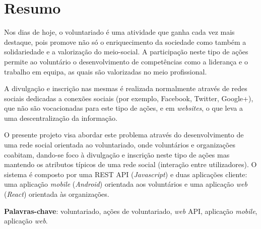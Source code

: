 \section*{Resumo}
Nos dias de hoje, o voluntariado é uma atividade que ganha cada vez mais destaque, pois promove não só o enriquecimento da sociedade como também a solidariedade e a valorização do meio-social. A participação neste tipo de ações permite ao voluntário o desenvolvimento de competências como a liderança e o trabalho em equipa, as quais são valorizadas no meio profissional. \par \smallskip
A divulgação e inscrição nas mesmas é realizada normalmente através de redes sociais dedicadas a conexões sociais (por exemplo, Facebook, Twitter, Google+), que  não são vocacionadas para este tipo de ações, e em \textit{websites}, o que leva a uma descentralização da informação. \par \smallskip
O presente projeto visa abordar este problema através do desenvolvimento de uma rede social orientada ao voluntariado, onde voluntários e organizações coabitam, dando-se foco à divulgação e inscrição neste tipo de ações mas mantendo os atributos típicos de uma rede social (interação entre utilizadores). O sistema é composto por uma REST API (\textit{Javascript}) e duas aplicações cliente: uma aplicação \textit{mobile} (\textit{Android}) orientada aos voluntários e uma aplicação \textit{web} (\textit{React}) orientada às organizações. \par \smallskip
\textbf{Palavras-chave}: voluntariado, ações de voluntariado, \textit{web} API, aplicação \textit{mobile}, aplicação \textit{web}.